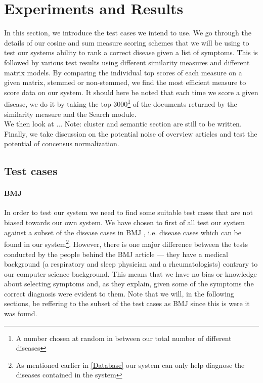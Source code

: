 \chapter{Experiments and Results\label{ExperimentsResults}}

In this section, we introduce the test cases we intend to use. We go
through the details of our cosine and sum measure scoring schemes that
we will be using to test our systems ability to rank a correct disease
given a list of symptoms. This is followed by various test results
using different similarity measures and different matrix models. By
comparing the individual top scores of each measure on a given matrix,
stemmed or non-stemmed, we find the most efficient measure to score
data on our system. It should here be noted that each time we score a
given disease, we do it by taking the top 3000\footnote{A number
  chosen at random in between our total number of different diseases}
of the documents returned by the similarity measure and the Search
module. \\

We then look at  ... Note: cluster and
semantic section are still to be written. \\

Finally, we take discussion on the potential noise of overview
articles and test the potential of concensus normalization.

\section{Test cases}

\subsubsection{BMJ}
In order to test our system we need to find some suitable test cases
that are not biased towards our own system. We have chosen to first of
all test our system against a subset of the disease cases in BMJ
\cite{HangwiTang11102006}, i.e. disease cases which can be found in
our system\footnote{As mentioned earlier in \ref{Database} our system
  can only help diagnose the diseases contained in the
  system}. However, there is one major difference between the tests
conducted by the people behind the BMJ article --- they have a medical
background (a respiratory and sleep physician and a rheumatologists)
contrary to our computer science background. This means that we have
no bias or knowledge about selecting symptoms and, as they explain,
given some of the symptoms the correct diagnosis were evident to
them. Note that we will, in the following sections, be reffering to
the subset of the test cases as BMJ since this is were it was
found. \\

